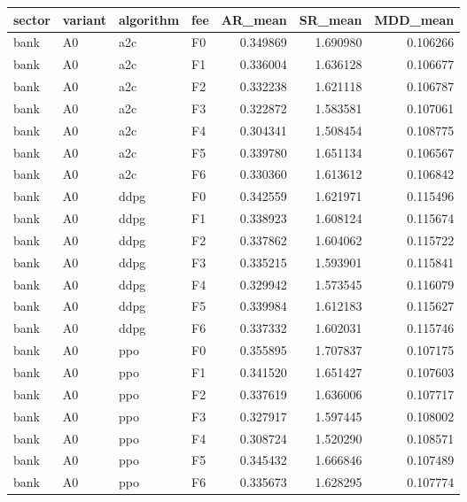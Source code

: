 \begin{tabular}{llllrrr}
\toprule
    sector & variant & algorithm & fee &   AR\_mean &   SR\_mean &  MDD\_mean \\
\midrule
      bank &      A0 &       a2c &  F0 &  0.349869 &  1.690980 &  0.106266 \\
      bank &      A0 &       a2c &  F1 &  0.336004 &  1.636128 &  0.106677 \\
      bank &      A0 &       a2c &  F2 &  0.332238 &  1.621118 &  0.106787 \\
      bank &      A0 &       a2c &  F3 &  0.322872 &  1.583581 &  0.107061 \\
      bank &      A0 &       a2c &  F4 &  0.304341 &  1.508454 &  0.108775 \\
      bank &      A0 &       a2c &  F5 &  0.339780 &  1.651134 &  0.106567 \\
      bank &      A0 &       a2c &  F6 &  0.330360 &  1.613612 &  0.106842 \\
      bank &      A0 &      ddpg &  F0 &  0.342559 &  1.621971 &  0.115496 \\
      bank &      A0 &      ddpg &  F1 &  0.338923 &  1.608124 &  0.115674 \\
      bank &      A0 &      ddpg &  F2 &  0.337862 &  1.604062 &  0.115722 \\
      bank &      A0 &      ddpg &  F3 &  0.335215 &  1.593901 &  0.115841 \\
      bank &      A0 &      ddpg &  F4 &  0.329942 &  1.573545 &  0.116079 \\
      bank &      A0 &      ddpg &  F5 &  0.339984 &  1.612183 &  0.115627 \\
      bank &      A0 &      ddpg &  F6 &  0.337332 &  1.602031 &  0.115746 \\
      bank &      A0 &       ppo &  F0 &  0.355895 &  1.707837 &  0.107175 \\
      bank &      A0 &       ppo &  F1 &  0.341520 &  1.651427 &  0.107603 \\
      bank &      A0 &       ppo &  F2 &  0.337619 &  1.636006 &  0.107717 \\
      bank &      A0 &       ppo &  F3 &  0.327917 &  1.597445 &  0.108002 \\
      bank &      A0 &       ppo &  F4 &  0.308724 &  1.520290 &  0.108571 \\
      bank &      A0 &       ppo &  F5 &  0.345432 &  1.666846 &  0.107489 \\
      bank &      A0 &       ppo &  F6 &  0.335673 &  1.628295 &  0.107774 \\

\end{tabular}

